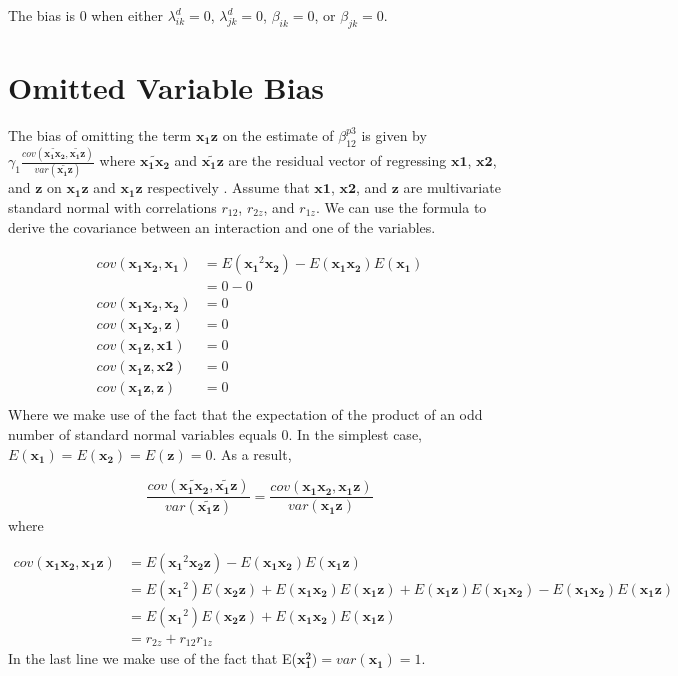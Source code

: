 \documentclass[12pt]{article}
\begin{document}
The bias is 0 when either $\lambda^d_{ik} = 0$, $\lambda^d_{jk} = 0$, $\beta_{ik} = 0$, or $\beta_{jk} = 0$.

\section{Omitted Variable Bias} \label{appendix-omitted}

The bias of omitting the term $\mathbf{x_1 z}$ on the estimate of $\beta^{p3}_{12}$ is given by $\gamma_1 \frac{cov(\widetilde{\mathbf{x_1 x_2}}, \widetilde{\mathbf{x_1 z}})} {var(\widetilde{\mathbf{x_1 z}})}$ where $\widetilde{\mathbf{x_1 x_2}}$ and $\widetilde{\mathbf{x_1 z}}$ are the residual vector of regressing $\mathbf{x1}$, $\mathbf{x2}$, and $\mathbf{z}$ on $\mathbf{x_1 z}$ and $\mathbf{x_1 z}$ respectively \citep{angrist2008mostly,cunningham_causal_2018}. 
Assume that $\mathbf{x1}$, $\mathbf{x2}$, and $\mathbf{z}$ are multivariate standard normal with correlations $r_{12}$, $r_{2z}$, and $r_{1z}$. We can use the \citet{isserlis_formula_1918} formula to derive the covariance between an interaction and one of the variables. 

\begin{align*}
cov(\mathbf{x_1 x_2}, \mathbf{x_1}) &= E(\mathbf{x_1}^2 \mathbf{x_2}) - E(\mathbf{x_1 x_2}) E(\mathbf{x_1}) \\
&= 0 - 0 \\
cov(\mathbf{x_1 x_2}, \mathbf{x_2}) &= 0 \\
cov(\mathbf{x_1 x_2}, \mathbf{z}) &= 0 \\
cov(\mathbf{x_1 z}, \mathbf{x1}) &= 0 \\
cov(\mathbf{x_1 z}, \mathbf{x2}) &= 0 \\
cov(\mathbf{x_1 z}, \mathbf{z}) &= 0 \\
\end{align*}
Where we make use of the fact that the expectation of the product of an odd number of standard normal variables equals 0. In the simplest case, $E(\mathbf{x_1}) =  E(\mathbf{x_2}) = E(\mathbf{z}) = 0$.
As a result,

\begin{equation*}
\frac{cov(\widetilde{\mathbf{x_1 x_2}}, \widetilde{\mathbf{x_1 z}})}{var(\widetilde{\mathbf{x_1 z}})} =
\frac{cov(\mathbf{x_1 x_2}, \mathbf{x_1 z})}{var(\mathbf{x_1 z})} 
\end{equation*}
where 

\begin{align*}
cov(\mathbf{x_1 x_2}, \mathbf{x_1 z}) &= E(\mathbf{x_1}^2 \mathbf{x_2 z }) - E(\mathbf{x_1 x_2}) E(\mathbf{x_1 z}) \\
&= E(\mathbf{x_1}^2) E(\mathbf{x_2 z }) + E(\mathbf{x_1 x_2}) E(\mathbf{x_1 z}) + E(\mathbf{x_1 z}) E(\mathbf{x_1 x_2}) - E(\mathbf{x_1 x_2}) E(\mathbf{x_1 z}) \\
&= E(\mathbf{x_1}^2) E(\mathbf{x_2 z }) + E(\mathbf{x_1 x_2}) E(\mathbf{x_1 z}) \\
&= r_{2z} + r_{12} r_{1z}
\end{align*}
In the last line we make use of the fact that E($\mathbf{x_1^2}) = var(\mathbf{x_1}) = 1$.
\end{document}
